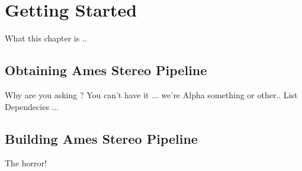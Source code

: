 \chapter{Getting Started}

What this chapter is ..

\section{Obtaining Ames Stereo Pipeline}

Why are you asking ? You can't have it ... we're Alpha something or other..
List Dependecies ...

\section{Building Ames Stereo Pipeline}

The horror!

